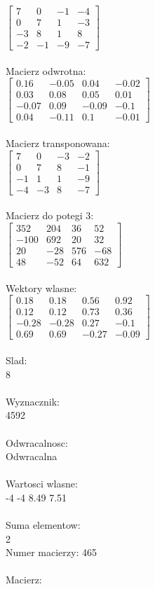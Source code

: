 \documentclass[a4paper,12pt]{article}
\begin{document}
$\begin{bmatrix} 7&0&-1&-4\\0&7&1&-3\\-3&8&1&8\\-2&-1&-9&-7 \end{bmatrix}$
\\
\\
Macierz odwrotna:\\

$\begin{bmatrix} 0.16&-0.05&0.04&-0.02\\0.03&0.08&0.05&0.01\\-0.07&0.09&-0.09&-0.1\\0.04&-0.11&0.1&-0.01 \end{bmatrix}$
\\
\\
Macierz transponowana:\\

$\begin{bmatrix} 7&0&-3&-2\\0&7&8&-1\\-1&1&1&-9\\-4&-3&8&-7 \end{bmatrix}$
\\
\\
Macierz do potegi 3:\\

$\begin{bmatrix} 352&204&36&52\\-100&692&20&32\\20&-28&576&-68\\48&-52&64&632 \end{bmatrix}$
\\
\\
Wektory wlasne:\\

$\begin{bmatrix} 0.18&0.18&0.56&0.92\\0.12&0.12&0.73&0.36\\-0.28&-0.28&0.27&-0.1\\0.69&0.69&-0.27&-0.09 \end{bmatrix}$
\\
\\
Slad:\\
8
\\
\\
Wyznacznik:\\
4592
\\
\\
Odwracalnosc:\\
Odwracalna
\\
\\
Wartosci wlasne:\\
-4 -4 8.49 7.51
\\
\\
Suma elementow:\\
2
\\
\newpage
Numer macierzy:
465
\\
\\
Macierz:\\
\end{document}
